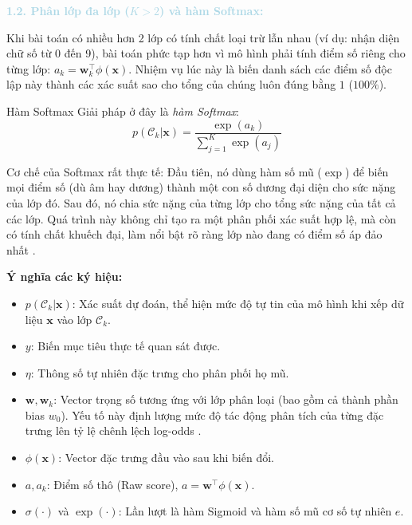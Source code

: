 \vspace{0.5em}
\noindent\textcolor{lightblue}{\textbf{1.2.  Phân lớp đa lớp ($K > 2$) và hàm Softmax:}}

Khi bài toán có nhiều hơn 2 lớp có tính chất loại trừ lẫn nhau (ví dụ: nhận diện chữ số từ 0 đến 9), bài toán phức tạp hơn vì mô hình phải tính điểm số riêng cho từng lớp: $a_k = \mathbf{w}_k^\top \phi(\mathbf{x})$. Nhiệm vụ lúc này là biến danh sách các điểm số độc lập này thành các xác suất sao cho tổng của chúng luôn đúng bằng $1$ ($100\%$).

\begin{importantbox}{Hàm Softmax}
Giải pháp ở đây là \textit{hàm Softmax}:
\begin{equation}
    p(\mathcal{C}_k | \mathbf{x}) = \frac{\exp(a_k)}{\sum_{j=1}^K \exp(a_j)}
\end{equation}

Cơ chế của Softmax rất thực tế: Đầu tiên, nó dùng hàm số mũ ($\exp$) để biến mọi điểm số (dù âm hay dương) thành một con số dương đại diện cho sức nặng của lớp đó. Sau đó, nó chia sức nặng của từng lớp cho tổng sức nặng của tất cả các lớp. Quá trình này không chỉ tạo ra một phân phối xác suất hợp lệ, mà còn có tính chất khuếch đại, làm nổi bật rõ ràng lớp nào đang có điểm số áp đảo nhất \cite{bishop2006pattern, kleinbaum2010logistic}.
\end{importantbox}

\vspace{0.5em}
\noindent\textbf{Ý nghĩa các ký hiệu:}
\begin{itemize}
    \item $p(\mathcal{C}_k | \mathbf{x})$: Xác suất dự đoán, thể hiện mức độ tự tin của mô hình khi xếp dữ liệu $\mathbf{x}$ vào lớp $\mathcal{C}_k$.
    \item $y$: Biến mục tiêu thực tế quan sát được.
    \item $\eta$: Thông số tự nhiên đặc trưng cho phân phối họ mũ.
    \item $\mathbf{w}, \mathbf{w}_k$: Vector trọng số tương ứng với lớp phân loại (bao gồm cả thành phần bias $w_0$). Yếu tố này định lượng mức độ tác động phân tích của từng đặc trưng lên tỷ lệ chênh lệch log-odds \cite{kleinbaum2010logistic}.
    \item $\phi(\mathbf{x})$: Vector đặc trưng đầu vào sau khi biến đổi.
    \item $a, a_k$: Điểm số thô (Raw score), $a = \mathbf{w}^\top \phi(\mathbf{x})$.
     \item $\sigma(\cdot)$ và $\exp(\cdot)$: Lần lượt là hàm Sigmoid và hàm số mũ cơ số tự nhiên $e$.
\end{itemize}

